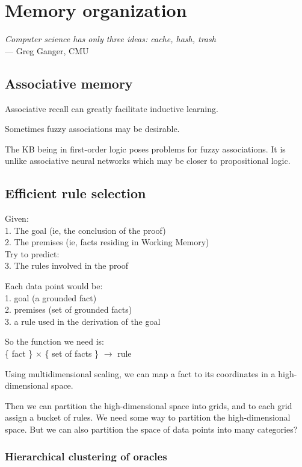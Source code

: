 \chapter{Memory organization}
\begin{flushright}
\emph{Computer science has only three ideas: cache, hash, trash}\\ --- Greg Ganger, CMU
\end{flushright}
\minitoc

\section{Associative memory}
\label{sec:associative-memory}

Associative recall can greatly facilitate inductive learning.

Sometimes fuzzy associations may be desirable.

The KB being in first-order logic poses problems for fuzzy associations.  It is unlike associative neural networks which may be closer to propositional logic.

\section{Efficient rule selection}

Given:\\
1. The goal (ie, the conclusion of the proof)\\
2. The premises (ie, facts residing in Working Memory)\\
Try to predict:\\
3. The rules involved in the proof

Each data point would be:\\
1.  goal (a grounded fact)\\
2.  premises (set of grounded facts)\\
3.  a rule used in the derivation of the goal

So the function we need is:\\
\{ fact \} $\times$ \{ set of facts \} $\rightarrow$ rule

Using multidimensional scaling, we can map a fact to its coordinates in a high-dimensional space.

Then we can partition the high-dimensional space into grids, and to each grid assign a bucket of rules.  We need some way to partition the high-dimensional space.  But we can also partition the space of data points into many categories?

\subsection{Hierarchical clustering of oracles}
\label{sec:hi-oracle}

\underconst